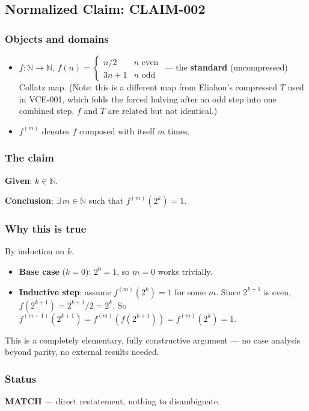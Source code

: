 \documentclass[11pt]{article}
\begin{document}
\subsection*{Normalized Claim: CLAIM-002}
\subsubsection*{Objects and domains}
\begin{itemize}
\item $f : \mathbb{N} \to \mathbb{N}$, $f(n) = \begin{cases} n/2 & n \text{ even} \\ 3n+1 & n \text{ odd} \end{cases}$ --- the \textbf{standard} (uncompressed) Collatz map. (Note: this is a different map from Eliahou's compressed $T$ used in VCE-001, which folds the forced halving after an odd step into one combined step. $f$ and $T$ are related but not identical.)
\item $f^{(m)}$ denotes $f$ composed with itself $m$ times.
\end{itemize}
\subsubsection*{The claim}
\textbf{Given}: $k \in \mathbb{N}$.

\textbf{Conclusion}: $\exists\, m \in \mathbb{N}$ such that $f^{(m)}(2^k) = 1$.

\subsubsection*{Why this is true}
By induction on $k$.

\begin{itemize}
\item \textbf{Base case} ($k=0$): $2^0 = 1$, so $m=0$ works trivially.
\item \textbf{Inductive step}: assume $f^{(m)}(2^k) = 1$ for some $m$. Since $2^{k+1}$ is even, $f(2^{k+1}) = 2^{k+1}/2 = 2^k$. So $f^{(m+1)}(2^{k+1}) = f^{(m)}(f(2^{k+1})) = f^{(m)}(2^k) = 1$.
\end{itemize}
This is a completely elementary, fully constructive argument --- no case analysis beyond parity, no external results needed.

\subsubsection*{Status}
\textbf{MATCH} --- direct restatement, nothing to disambiguate.
\end{document}
